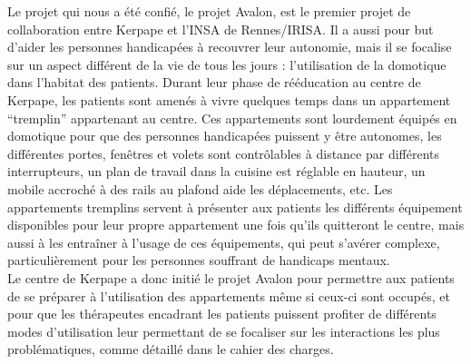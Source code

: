 Le projet qui nous a été confié, le projet Avalon, est le premier projet de collaboration entre Kerpape et l'INSA de Rennes/IRISA. Il a aussi pour but d'aider les personnes handicapées à recouvrer leur autonomie, mais il se focalise sur un aspect différent de la vie de tous les jours : l'utilisation de la domotique dans l'habitat des patients. Durant leur phase de rééducation au centre de Kerpape, les patients sont amenés à vivre quelques temps dans un appartement \enquote{tremplin} appartenant au centre. Ces appartements sont lourdement équipés en domotique pour que des personnes handicapées puissent y être autonomes, les différentes portes, fenêtres et volets sont contrôlables à distance par différents interrupteurs, un plan de travail dans la cuisine est réglable en hauteur, un mobile accroché à des rails au plafond aide les déplacements, etc.
Les appartements tremplins servent à présenter aux patients les différents équipement disponibles pour leur propre appartement une fois qu'ils quitteront le centre, mais aussi à les entraîner à l'usage de ces équipements, qui peut s'avérer complexe, particulièrement pour les personnes souffrant de handicaps mentaux. \\

Le centre de Kerpape a donc initié le projet Avalon pour permettre aux patients de se préparer à l'utilisation des appartements même si ceux-ci sont occupés, et pour que les thérapeutes encadrant les patients puissent profiter de différents modes d'utilisation leur permettant de se focaliser sur les interactions les plus problématiques, comme détaillé dans le cahier des charges.
